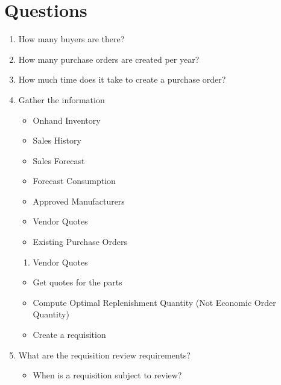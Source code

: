 \documentclass[letterpaper,10pt,english]{sphinxmanual}
\begin{document}
\chapter{Questions}
\label{Questions::doc}\label{Questions:questions}\begin{enumerate}
\item {} 
How many buyers are there?

\item {} 
How many purchase orders are created per year?

\item {} 
How much time does it take to create a purchase order?

\item {} 
Gather the information
\begin{itemize}
\item {} 
Onhand Inventory

\item {} 
Sales History

\item {} 
Sales Forecast

\item {} 
Forecast Consumption

\item {} 
Approved Manufacturers

\item {} 
Vendor Quotes

\item {} 
Existing Purchase Orders

\end{itemize}
\begin{enumerate}
\item {} 
Vendor Quotes

\end{enumerate}
\begin{itemize}
\item {} 
Get quotes for the parts

\item {} 
Compute Optimal Replenishment Quantity (Not Economic Order
Quantity)

\item {} 
Create a requisition

\end{itemize}

\item {} 
What are the requisition review requirements?
\begin{itemize}
\item {} 
When is a requisition subject to review?


\end{itemize}
\end{enumerate}
\end{document}
